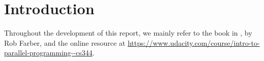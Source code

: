\chapter{Introduction}
\label{chap:introduction}


Throughout the development of this report, we mainly refer to the book in \cite{farber2011cuda}, by Rob Farber, and the online resource at \url{https://www.udacity.com/course/intro-to-parallel-programming--cs344}.
